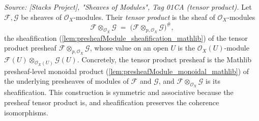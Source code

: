 \begin{definition}\leanok
  \label{def:sheafTensorObj}
  \textit{Source: [Stacks Project], "Sheaves of Modules", Tag 01CA (tensor
  product).}
  Let \(\mathcal{F}, \mathcal{G}\) be sheaves of \(\mathcal{O}_X\)-modules. Their
  \emph{tensor product} is the sheaf of \(\mathcal{O}_X\)-modules
  \[
    \mathcal{F} \otimes_{\mathcal{O}_X} \mathcal{G}
      \;=\; \bigl(\mathcal{F} \otimes_{p,\mathcal{O}_X} \mathcal{G}\bigr)^{\#},
  \]
  the sheafification (\cref{lem:presheafModule_sheafification_mathlib}) of the
  tensor product presheaf \(\mathcal{F} \otimes_{p,\mathcal{O}_X} \mathcal{G}\),
  whose value on an open \(U\) is the \(\mathcal{O}_X(U)\)-module
  \(\mathcal{F}(U) \otimes_{\mathcal{O}_X(U)} \mathcal{G}(U)\). Concretely, the
  tensor product presheaf is the Mathlib presheaf-level monoidal product
  (\cref{lem:presheafModule_monoidal_mathlib}) of the underlying presheaves of
  modules of \(\mathcal{F}\) and \(\mathcal{G}\), and
  \(\mathcal{F} \otimes_{\mathcal{O}_X} \mathcal{G}\) is its sheafification. This
  construction is symmetric and associative because the presheaf tensor product
  is, and sheafification preserves the coherence isomorphisms.
\end{definition}

